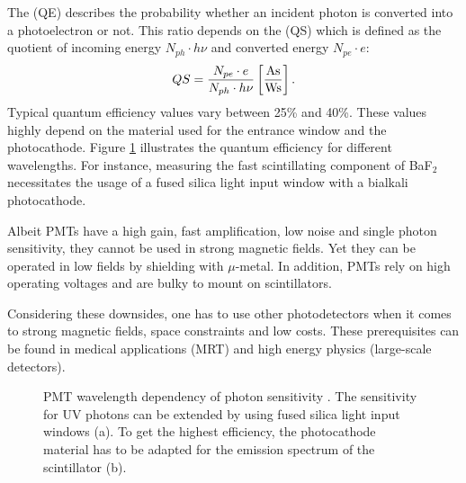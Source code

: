 The  (QE) describes the probability whether an incident photon is converted into a photoelectron or not. This ratio depends on the  (QS) which is defined as the quotient of incoming energy $N_{ph}\cdot h\nu$ and converted energy $N_{pe}\cdot e$:
\begin{align}
QS=\frac{N_{pe}\cdot e}{N_{ph}\cdot h\nu} \left[\si{\ampere\second\over\watt\second}\right].
\label{eq:quantum_efficieny_pmt}
\end{align} 
Typical quantum efficiency values vary between 25\% and 40\%. These values highly depend on the material used for the entrance window and the photocathode. Figure \ref{fig:ch3:pmt_sensitivity} illustrates the quantum efficiency for different wavelengths. For instance, measuring the fast scintillating component of BaF$_2$ necessitates the usage of a fused silica light input window with a bialkali photocathode. \par 
Albeit PMTs have a high gain, fast amplification, low noise and single photon sensitivity, they cannot be used in strong magnetic fields. Yet they can be operated in low fields by shielding with $\mu$-metal. In addition, PMTs rely on high operating voltages and are bulky to mount on scintillators. \par 
Considering these downsides, one has to use other photodetectors when it comes to strong magnetic fields, space constraints and low costs. These prerequisites can be found in medical applications (MRT) and high energy physics (large-scale detectors).
\begin{figure}[h!]
	\hfill
	\hfill
	\caption[Photon sensitivity of PMTs]{PMT wavelength dependency of photon sensitivity \cite{wermes}. The sensitivity for UV photons can be extended by using fused silica light input windows (a). To get the highest efficiency, the photocathode material has to be adapted for the emission spectrum of the scintillator (b).}
	\label{fig:ch3:pmt_sensitivity}
\end{figure} 
